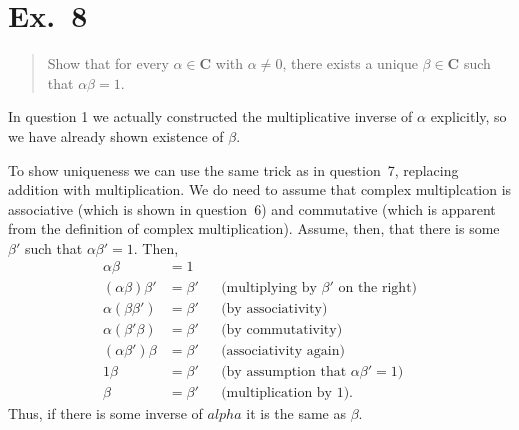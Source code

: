 \documentclass[10pt, a4paper, twocolumn]{article}
\newcommand{\set}[1]{\mathbold{#1}}
\begin{document}
\section*{Ex.~8}
\begin{quote}
  Show that for every $\alpha\in \set{C}$ with $\alpha \neq 0$, there exists a unique $\beta\in \set{C}$ such that $\alpha\beta = 1$.
\end{quote}

In question 1 we actually constructed the multiplicative inverse of $\alpha$
explicitly, so we have already shown existence of $\beta$.

To show uniqueness we can use the same trick as in question~7, replacing addition with multiplication. We do need to assume that complex multiplcation is associative (which is shown in question~6) and commutative (which is apparent from the definition of complex multiplication). Assume, then, that there is some $\beta'$ such that $\alpha\beta'=1$. Then,  
\begin{equation*}
  \begin{aligned}
    \alpha \beta &= 1 \\
    (\alpha \beta) \beta' &= \beta' &&\text{(multiplying by $\beta'$ on the right)} \\
    \alpha (\beta \beta') &= \beta' &&\text{(by associativity)} \\
    \alpha (\beta' \beta) &= \beta' &&\text{(by commutativity)} \\
    (\alpha \beta') \beta &= \beta' &&\text{(associativity again)} \\
    1 \beta &= \beta' &&\text{(by assumption that $\alpha\beta'=1$)} \\
    \beta &= \beta' &&\text{(multiplication by 1)}. 
  \end{aligned}
\end{equation*}
Thus, if there is some inverse of $alpha$ it is the same as $\beta$.
\end{document}
